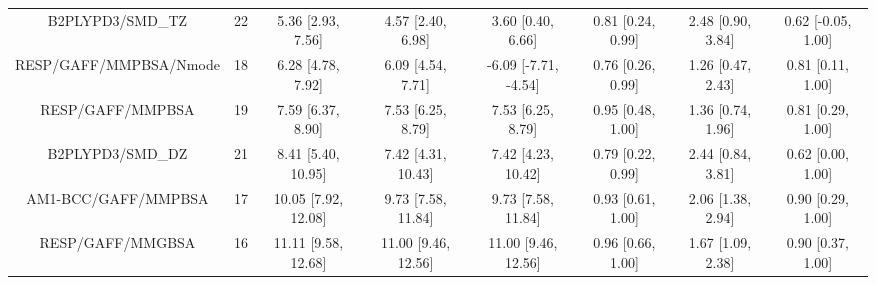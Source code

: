 \documentclass[8pt]{article}
\begin{document}
\begin{center}
\begin{footnotesize}
\begin{longtable}{|cccccccc|}
                   B2PLYPD3/SMD\_TZ &    22 &    5.36 [2.93, 7.56] &    4.57 [2.40, 6.98] &     3.60 [0.40, 6.66] &  0.81 [0.24, 0.99] &    2.48 [0.90, 3.84] &   0.62 [-0.05, 1.00] \\
             RESP/GAFF/MMPBSA/Nmode &    18 &    6.28 [4.78, 7.92] &    6.09 [4.54, 7.71] &  -6.09 [-7.71, -4.54] &  0.76 [0.26, 0.99] &    1.26 [0.47, 2.43] &    0.81 [0.11, 1.00] \\
                   RESP/GAFF/MMPBSA &    19 &    7.59 [6.37, 8.90] &    7.53 [6.25, 8.79] &     7.53 [6.25, 8.79] &  0.95 [0.48, 1.00] &    1.36 [0.74, 1.96] &    0.81 [0.29, 1.00] \\
                   B2PLYPD3/SMD\_DZ &    21 &   8.41 [5.40, 10.95] &   7.42 [4.31, 10.43] &    7.42 [4.23, 10.42] &  0.79 [0.22, 0.99] &    2.44 [0.84, 3.81] &    0.62 [0.00, 1.00] \\
                AM1-BCC/GAFF/MMPBSA &    17 &  10.05 [7.92, 12.08] &   9.73 [7.58, 11.84] &    9.73 [7.58, 11.84] &  0.93 [0.61, 1.00] &    2.06 [1.38, 2.94] &    0.90 [0.29, 1.00] \\
                   RESP/GAFF/MMGBSA &    16 &  11.11 [9.58, 12.68] &  11.00 [9.46, 12.56] &   11.00 [9.46, 12.56] &  0.96 [0.66, 1.00] &    1.67 [1.09, 2.38] &    0.90 [0.37, 1.00] \\
\end{longtable}
\end{footnotesize}
\end{center}
\end{document}
